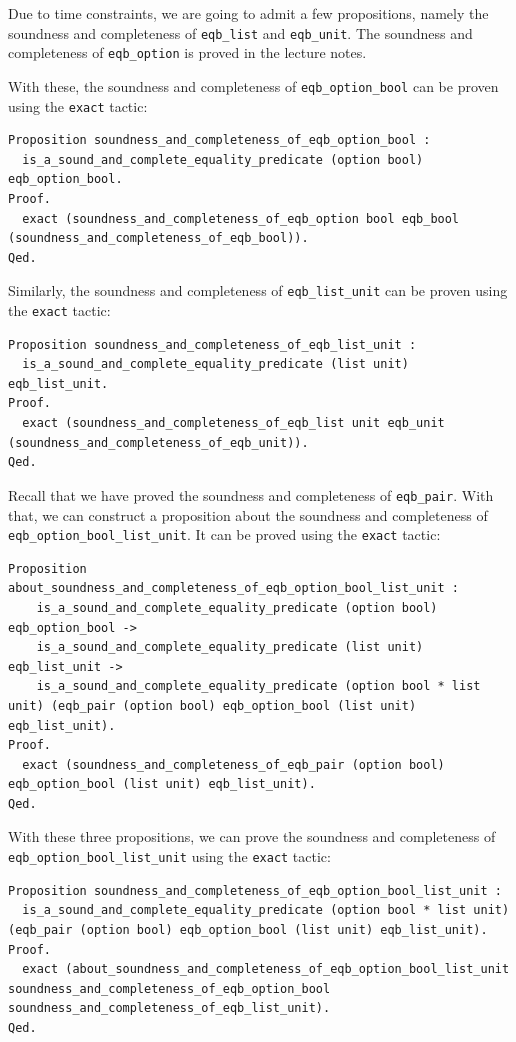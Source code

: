 \documentclass{article}
\begin{document}
Due to time constraints, we are going to admit a few propositions, namely the soundness and completeness of \texttt{eqb\_list} and \texttt{eqb\_unit}. The soundness and completeness of \texttt{eqb\_option} is proved in the lecture notes. 

With these, the soundness and completeness of \texttt{eqb\_option\_bool} can be proven using the \texttt{exact} tactic:

\begin{lstlisting}
Proposition soundness_and_completeness_of_eqb_option_bool :
  is_a_sound_and_complete_equality_predicate (option bool) eqb_option_bool.
Proof.
  exact (soundness_and_completeness_of_eqb_option bool eqb_bool (soundness_and_completeness_of_eqb_bool)).
Qed.
\end{lstlisting}

Similarly, the soundness and completeness of \texttt{eqb\_list\_unit} can be proven using the \texttt{exact} tactic:

\begin{lstlisting}
Proposition soundness_and_completeness_of_eqb_list_unit :
  is_a_sound_and_complete_equality_predicate (list unit) eqb_list_unit.
Proof.
  exact (soundness_and_completeness_of_eqb_list unit eqb_unit (soundness_and_completeness_of_eqb_unit)).
Qed.
\end{lstlisting}

Recall that we have proved the soundness and completeness of \texttt{eqb\_pair}. With that, we can construct a proposition about the soundness and completeness of \texttt{eqb\_option\_bool\_list\_unit}. It can be proved using the \texttt{exact} tactic:

\begin{lstlisting}
Proposition about_soundness_and_completeness_of_eqb_option_bool_list_unit :
    is_a_sound_and_complete_equality_predicate (option bool) eqb_option_bool ->
    is_a_sound_and_complete_equality_predicate (list unit) eqb_list_unit ->
    is_a_sound_and_complete_equality_predicate (option bool * list unit) (eqb_pair (option bool) eqb_option_bool (list unit) eqb_list_unit).
Proof.
  exact (soundness_and_completeness_of_eqb_pair (option bool) eqb_option_bool (list unit) eqb_list_unit).
Qed.
\end{lstlisting}

With these three propositions, we can prove the soundness and completeness of \texttt{eqb\_option\_bool\_list\_unit} using the \texttt{exact} tactic:

\begin{lstlisting}
Proposition soundness_and_completeness_of_eqb_option_bool_list_unit :
  is_a_sound_and_complete_equality_predicate (option bool * list unit) (eqb_pair (option bool) eqb_option_bool (list unit) eqb_list_unit).
Proof.
  exact (about_soundness_and_completeness_of_eqb_option_bool_list_unit soundness_and_completeness_of_eqb_option_bool soundness_and_completeness_of_eqb_list_unit).
Qed.
\end{lstlisting}
\end{document}
